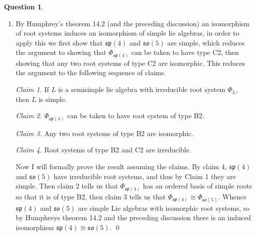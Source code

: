 \documentclass[10.5pt]{article}
\theoremstyle{definition}
\newtheorem{pb}{Question}
\numberwithin{example}{subsection}
\numberwithin{proposition}{subsection}
\begin{document}
\begin{pb}
\begin{enumerate}
            \emph{Proof of Claim 2.} Using claim 1, this is a simple calculation using ad-invariance of the killing form: Let \(h \in H\) with \(\alpha(h) \neq 0\)
            \begin{align}
                \kappa(x_\alpha,y_\alpha) &= \alpha(h)^{-1}\kappa([h,x_\alpha],y_\alpha) \label{root decomp} \\
                &\overset{\operatorname{ad} \text{-invariance}}{=} \alpha(h)^{-1}\kappa(h,[x_\alpha,y_\alpha]) \\
                &\overset{\text{Claim 1}}{=} \alpha(h)^{-1}6 \operatorname{tr}(h[x_\alpha,y_\alpha]) \label{root sum}
            \end{align}
            Here equation \eqref{root decomp} follows trivially from the definition of \(x_\alpha\), i.e. the action of the Cartan subalgebra on the root decomposition, moreover equation \eqref{root sum} follows from \([L_\alpha,L_{-\alpha}] \subset H\) and claim 1. \qed

            \item By Humphrey's theorem 14.2 (and the preceding discussion) an isomorphism of root systems induces an isomorphism of simple lie algebras, in order to apply this we first show that \(\mathfrak{sp}(4)\) and \(\mathfrak{so}(5)\) are simple, which reduces the argument to showing that \(\Phi_{\mathfrak{sp}(4)}\) can be taken to have type C2, then showing that any two root systems of type C2 are isomorphic. This reduces the argument to the following sequence of claims.
            
            \emph{Claim 1.} If \(L\) is a semisimple lie algebra with irreducible root system \(\Phi_L\), then \(L\) is simple.

            \emph{Claim 2.} \(\Phi_{\mathfrak{sp}(4)}\) can be taken to have root system of type B2.

            \emph{Claim 3.} Any two root systems of type B2 are isomorphic.

            \emph{Claim 4.} Root systems of type B2 and C2 are irreducible.

            Now I will formally prove the result assuming the claims. By claim 4, \(\mathfrak{sp}(4)\) and \(\mathfrak{so}(5)\) have irreducible root systems, and thus by Claim 1 they are simple. Then claim 2 tells us that \(\Phi_{\mathfrak{sp}(4)}\) has an ordered basis of simple roots so that it is of type B2, then claim 3 tells us that \(\Phi_{\mathfrak{sp}(4)} \cong \Phi_{\mathfrak{so}(5)}\). Whence \(\mathfrak{sp}(4)\) and \(\mathfrak{so}(5)\) are simple Lie algebras with isomorphic root systems, so by Humphreys theorem 14.2 and the preceding discussion there is an induced isomorphism \(\mathfrak{sp}(4) \cong \mathfrak{so}(5)\). \qed


\end{enumerate}
\end{pb}
\end{document}
